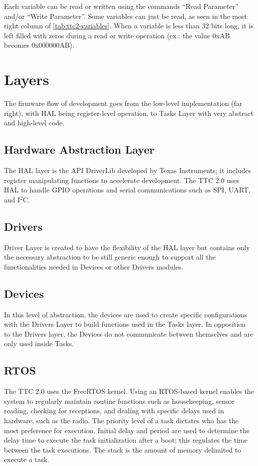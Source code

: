 Each variable can be read or written using the commands ``Read Parameter'' and/or ``Write Parameter''. Some variables can just be read, as seen in the most right column of \autoref{tab:ttc2-variables}. When a variable is less than 32 bits long, it is left filled with zeros during a read or write operation (ex.: the value 0xAB becomes 0x000000AB).

\section{Layers}

The firmware flow of development goes from the low-level implementation (far right), with HAL being register-level operation, to Tasks Layer with very abstract and high-level code.

\subsection{Hardware Abstraction Layer}

The HAL layer is the API DriverLib developed by Texas Instruments; it includes register manipulating functions to accelerate development. The TTC 2.0 uses HAL to handle GPIO operations and serial communications such as SPI, UART, and I$^2$C.

\subsection{Drivers}

Driver Layer is created to have the flexibility of the HAL layer but contains only the necessary abstraction to be still generic enough to support all the functionalities needed in Devices or other Drivers modules.

\subsection{Devices}

In this level of abstraction, the devices are used to create specific configurations with the Drivers Layer to build functions used in the Tasks layer. In opposition to the Drivers layer, the Devices do not communicate between themselves and are only used inside Tasks.

\subsection{RTOS}

The TTC 2.0 uses the FreeRTOS kernel. Using an RTOS-based kernel enables the system to regularly maintain routine functions such as housekeeping, sensor reading, checking for receptions, and dealing with specific delays used in hardware, such as the radio. The priority level of a task dictates who has the most preference for execution. Initial delay and period are used to determine the delay time to execute the task initialization after a boot; this regulates the time between the task executions. The stack is the amount of memory delimited to execute a task.

